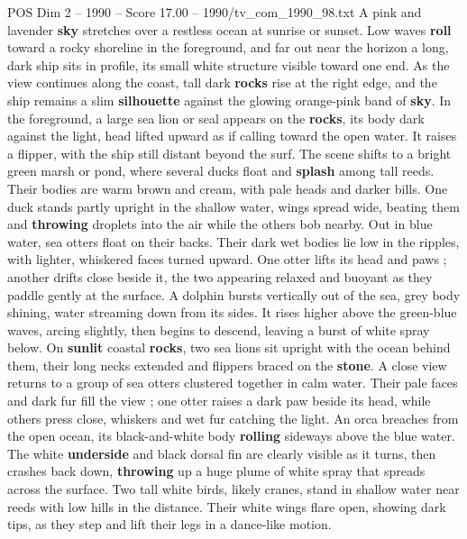 \begin{textsample}{POS Dim 2 – 1990 – Score 17.00 – 1990/tv\_com\_1990\_98.txt}  \label{ex:f2_pos_039}
A pink and lavender \textbf{sky} stretches over a restless ocean at sunrise or sunset.
Low waves \textbf{roll} toward a rocky shoreline in the foreground, and far out near the horizon a long, dark ship sits in profile, its small white structure visible toward one end.
As the view continues along the coast, tall dark \textbf{rocks} rise at the right edge, and the ship remains a slim \textbf{silhouette} against the glowing orange-pink band of \textbf{sky}.
In the foreground, a large sea lion or seal appears on the \textbf{rocks}, its body dark against the light, head lifted upward as if calling toward the open water.
It raises a flipper, with the ship still distant beyond the surf.
The scene shifts to a bright green marsh or pond, where several ducks float and \textbf{splash} among tall reeds.
Their bodies are warm brown and cream, with pale heads and darker bills.
One duck stands partly upright in the shallow water, wings spread wide, beating them and \textbf{throwing} droplets into the air while the others bob nearby.
Out in blue water, sea otters float on their backs.
Their dark wet bodies lie low in the ripples, with lighter, whiskered faces turned upward.
One otter lifts its head and paws ; another drifts close beside it, the two appearing relaxed and buoyant as they paddle gently at the surface.
A dolphin bursts vertically out of the sea, grey body shining, water streaming down from its sides.
It rises higher above the green-blue waves, arcing slightly, then begins to descend, leaving a burst of white spray below.
On \textbf{sunlit} coastal \textbf{rocks}, two sea lions sit upright with the ocean behind them, their long necks extended and flippers braced on the \textbf{stone}.
A close view returns to a group of sea otters clustered together in calm water.
Their pale faces and dark fur fill the view ; one otter raises a dark paw beside its head, while others press close, whiskers and wet fur catching the light.
An orca breaches from the open ocean, its black-and-white body \textbf{rolling} sideways above the blue water.
The white \textbf{underside} and black dorsal fin are clearly visible as it turns, then crashes back down, \textbf{throwing} up a huge plume of white spray that spreads across the surface.
Two tall white birds, likely cranes, stand in shallow water near reeds with low hills in the distance.
Their white wings flare open, showing dark tips, as they step and lift their legs in a dance-like motion.

\end{textsample}
